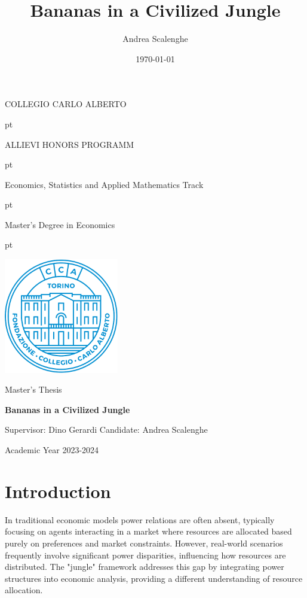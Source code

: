 \documentclass[12pt,a4paper]{article}
\title{Bananas in a Civilized Jungle}
\author{Andrea Scalenghe}
\date{\today}
\numberwithin{theorem}{section}
\numberwithin{definition}{section}
\numberwithin{example}{section}
\numberwithin{exercise}{section}
\begin{document}
\thispagestyle{empty}

\centerline {\Large{\textsc{COLLEGIO CARLO ALBERTO}}}
 pt

\centerline {\Large{\textsc ALLIEVI HONORS PROGRAMM}}

 pt

\centerline {{\textsc Economics, Statistics and Applied Mathematics Track}}

 pt

\centerline {\Large{\textsc Master's Degree in Economics}}
 pt





\centerline {\includegraphics[width=5cm]{cca.png}}

\vskip 1.2cm

\centerline {\normalsize {Master's Thesis}} 

\vskip 0.7cm

\centerline {\Large {\bf Bananas in a Civilized Jungle} }

\vskip 1.7cm

\noindent Supervisor: Dino Gerardi
\hfill  {Candidate: Andrea Scalenghe}

\vskip 2.7cm


\centerline{Academic Year 2023-2024}

\newpage
{
\hypersetup{linkcolor = black}
\tableofcontents
{}
}
\newpage

\section*{Introduction}

In traditional economic models power relations are often absent, typically focusing on agents interacting in a market where resources are allocated based purely on preferences and market constraints. However, real-world scenarios frequently involve significant power disparities, influencing how resources are distributed. The "jungle" framework addresses this gap by integrating power structures into economic analysis, providing a different understanding of resource allocation.
\end{document}
